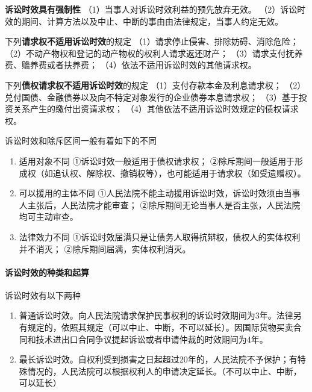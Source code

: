\documentclass[UTF8,12pt]{ctexart}
\numberwithin{equation}{section} %
\numberwithin{figure}{section}
\numberwithin{table}{section}
\begin{document}
	
	\textbf{诉讼时效具有强制性}
	（1）当事人对诉讼时效利益的预先放弃无效。
	（2）诉讼时效的期间、计算方法以及中止、中断的事由由法律规定，当事人约定无效。
	
	下列\textbf{请求权不适用诉讼时效}的规定
	（1）请求停止侵害、排除妨碍、消除危险；
	（2）不动产物权和登记的动产物权的权利人请求返还财产；
	（3）请求支付抚养费、赡养费或者扶养费；
	（4）依法不适用诉讼时效的其他请求权。
	
	下列\textbf{债权请求权不适用诉讼时效}的规定
	（1）支付存款本金及利息请求权；
	（2）兑付国债、金融债券以及向不特定对象发行的企业债券本息请求权；
	（3）基于投资关系产生的缴付出资请求权；
	（4）其他依法不适用诉讼时效规定的债权请求权。
	
	诉讼时效和除斥区间一般有着如下的不同
	\begin{enumerate}
		\item 适用对象不同
		①诉讼时效一般适用于债权请求权；
		②除斥期间一般适用于形成权（如追认权、解除权、撤销权等），也可能适用于请求权（如受遗赠权）。
		
		\item 可以援用的主体不同
		①人民法院不能主动援用诉讼时效，诉讼时效须由当事人主张后，人民法院才能审查；
		②除斥期间无论当事人是否主张，人民法院均可主动审查。
		
		\item 法律效力不同
		①诉讼时效届满只是让债务人取得抗辩权，债权人的实体权利并不消灭；
		②除斥期间届满，实体权利消灭。
	\end{enumerate}
	
	\paragraph{诉讼时效的种类和起算}
	诉讼时效有以下两种
	\begin{enumerate}
		\item 普通诉讼时效。向人民法院请求保护民事权利的诉讼时效期间为3年。法律另有规定的，依照其规定（可以中止、中断，不可以延长）。因国际货物买卖合同和技术进出口合同争议提起诉讼或者申请仲裁的时效期间为4年。
		
		\item 最长诉讼时效。自权利受到损害之日起超过20年的，人民法院不予保护；有特殊情况的，人民法院可以根据权利人的申请决定延长。（不可以中止、中断，可以延长）
	\end{enumerate}
	
\end{document}
